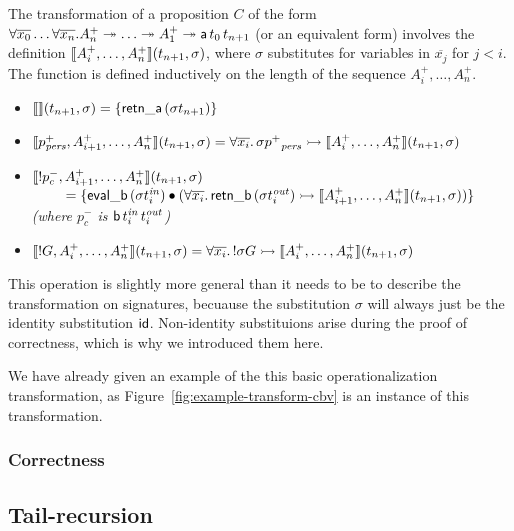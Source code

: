 The transformation of a proposition $C$ of the form $\forall
\overline{x_0}\ldots \forall \overline{x_n}. A^+_n \twoheadrightarrow \ldots
\twoheadrightarrow A^+_1 \twoheadrightarrow {\sf a}\,t_{0}\,t_{n+1}$ (or an equivalent form)
involves the definition
$\llbracket {A^+_i,\ldots,A^+_n} \rrbracket({t_{n+1}},{\sigma})$, where $\sigma$
substitutes for variables in $\overline{x_j}$ for $j < i$. The
function is defined inductively on the length of the sequence
$A^+_i,\ldots,A^+_n$.

\begin{itemize}
\item $\llbracket {} \rrbracket({t_{n+1}},{\sigma}) = \{ {\sf retn\_a}\,(\sigma{t_{n+1}}) \}$
\item $\llbracket {p^+_{\it pers},A^+_{i+1},\ldots,A^+_n} \rrbracket({t_{n+1}},{\sigma}) 
  = \forall \overline{x_i}.\, \sigma{p^+}_{\it pers} \rightarrowtail \llbracket {A^+_i,\ldots,A^+_n} \rrbracket({t_{n+1}},{\sigma})$
\item $\llbracket {{!}p^-_c,A^+_{i+1},\ldots,A^+_n} \rrbracket({t_{n+1}},{\sigma})$
  \\
  $~ \qquad = \{ {\sf eval\_b}\,({\sigma}t^{\it in}_i) \mathbin{\bullet}
  (\forall\overline{x_i}.\, {\sf retn\_b}\,(\sigma{t^{\it out}_i})
  \rightarrowtail \llbracket {A^+_{i+1},\ldots,A^+_n} \rrbracket({t_{n+1}},{\sigma})) \}$\\
  {\it (where $p^-_c$ is ${\sf b}\,t^{\it in}_i\,t^{\it out}_i$)}
\item $\llbracket {{!}G,A^+_i,\ldots,A^+_n} \rrbracket({t_{n+1}},{\sigma})
  = \forall \overline{x_i}.\, {!}\sigma{G} \rightarrowtail \llbracket {A^+_i,\ldots,A^+_n} \rrbracket({t_{n+1}},{\sigma})$
\end{itemize}

\noindent
This operation is slightly more general than it needs to be to
describe the transformation on signatures, becuause the substitution
$\sigma$ will always just be the identity substitution ${\sf id}$.
Non-identity substituions arise during the proof of correctness, which
is why we introduced them here.

We have already given an example of the this basic operationalization
transformation, as Figure~\ref{fig:example-transform-cbv} is an
instance of this transformation.

\subsubsection{Correctness}



\subsection{Tail-recursion}
\label{sec:trans-tail}

